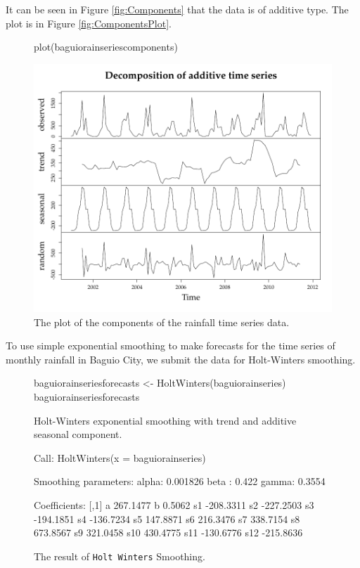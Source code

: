 \documentclass{article}\usepackage{graphicx, color}
\begin{document}
It can be seen in Figure \eqref{fig:Components} that the data is of additive type. The plot is in Figure \eqref{fig:ComponentsPlot}. 

\begin{figure}[!ht]
\centering
\begin{Schunk}
\begin{Sinput}
plot(baguiorainseriescomponents)
\end{Sinput}

\includegraphics[width=.7\textwidth]{figure/listings-ComponentsPlot} \end{Schunk}


\caption{\label{fig:ComponentsPlot} The plot of the components of the rainfall time series data.}
\end{figure}

To use simple exponential smoothing to make forecasts for the time series of monthly rainfall in Baguio City, we submit the data for Holt-Winters smoothing.

\begin{figure}[!ht]
\begin{Schunk}
\begin{Sinput}
baguiorainseriesforecasts <- HoltWinters(baguiorainseries)
baguiorainseriesforecasts
\end{Sinput}
\begin{Soutput}
Holt-Winters exponential smoothing with trend and additive seasonal component.

Call:
 HoltWinters(x = baguiorainseries) 

Smoothing parameters:
 alpha:  0.001826 
 beta :  0.422 
 gamma:  0.3554 

Coefficients:
         [,1]
a    267.1477
b      0.5062
s1  -208.3311
s2  -227.2503
s3  -194.1851
s4  -136.7234
s5   147.8871
s6   216.3476
s7   338.7154
s8   673.8567
s9   321.0458
s10  430.4775
s11 -130.6776
s12 -215.8636
\end{Soutput}
\end{Schunk}

\caption{\label{fig:HoltWSmoothing} The result of \texttt{Holt Winters} Smoothing.}
\end{figure}
\end{document}
